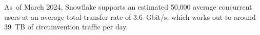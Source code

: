 \documentclass[letterpaper,twocolumn]{article}
\begin{document}
As~of March 2024, Snowflake supports an estimated 50,000 average concurrent users
at an average total transfer rate of 3.6~Gbit/s,
which works out to around 39~TB of circumvention traffic per day.
\end{document}
